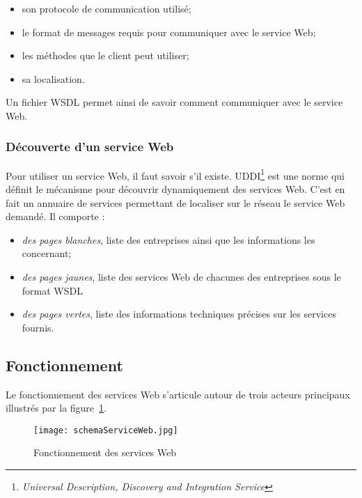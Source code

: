 \begin{itemize}
	\item son protocole de communication utilis\'e;
	\item le format de messages requis pour communiquer avec le service Web;
	\item les m\'ethodes que le client peut utiliser;
	\item sa localisation.

\end{itemize}

\vspace{0.20cm}

\noindent Un fichier WSDL permet ainsi de savoir comment communiquer avec le service Web.

\subsubsection{D\'ecouverte d'un service Web}

Pour utiliser un service Web, il faut savoir s'il existe.
UDDI\protect\footnote{\textit{Universal Description, Discovery and Integration Service}} est une norme qui d\'efinit le m\'ecanisme pour d\'ecouvrir dynamiquement des services Web.
C'est en fait un annuaire de services permettant de localiser sur le r\'eseau le service Web demand\'e.
\noindent Il comporte :

\begin{itemize}
	\item \textit{des pages blanches}, liste des entreprises ainsi que les informations les concernant;
	\item \textit{des pages jaunes}, liste des services Web de chacunes des entreprises sous le format WSDL
	\item \textit{des pages vertes}, liste des informations techniques pr\'ecises sur les services fournis.

\end{itemize}


\subsection{Fonctionnement}

Le fonctionnement des services Web s'articule autour de trois acteurs principaux illustr\'es par la figure~\ref{figure:schemaServiceWeb}.

\begin{figure}[!ht]
	\centering
	\texttt{[image: schemaServiceWeb.jpg]}
	\caption{Fonctionnement des services Web}
	\label{figure:schemaServiceWeb}

\end{figure}

